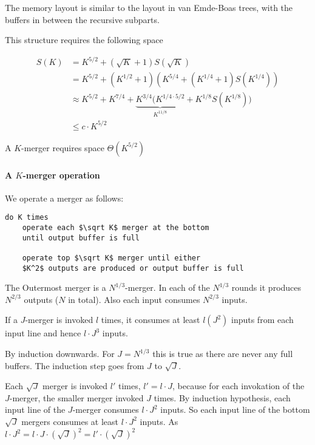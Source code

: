 The memory layout is similar to the layout in van Emde-Boas trees, with the buffers in between the recursive subparts. 

This structure requires the following space

\begin{align*}
S(K) &= K^{5/2} + (\sqrt K +1)S(\sqrt K)\\
	&= K^{5/2} + (K^{1/2}+1)(K^{5/4} + (K^{1/4}+1)S(K^{1/4}))\\
	&\approx K^{5/2} + K^{7/4} + \underbrace{K^{3/4}(K^{1/4\cdot 5/2}}_{K^{11/8}} + K^{1/8}S(K^{1/8}))\\
	&\leq c\cdot K^{5/2}
	\end{align*}
	
\begin{lem} A $K$-merger requires space $\Theta(K^{5/2})$\end{lem}

\paragraph{A $K$-merger operation} We operate a merger as follows:

\begin{lstlisting}
do K times
	operate each $\sqrt K$ merger at the bottom
	until output buffer is full
	
	operate top $\sqrt K$ merger until either
	$K^2$ outputs are produced or output buffer is full
\end{lstlisting}

The Outermost merger is a $N^{1/3}$-merger. In each of the $N^{1/3}$ rounds it produces $N^{2/3}$ outputs ($N$ in total). Also each input consumes $N^{2/3}$ inputs.

\begin{lem}
If a $J$-merger is invoked $l$ times, it consumes at least $l(J^2)$ inputs from each input line and hence $l\cdot J^3$ inputs.
\end{lem}

\begin{pr} By induction downwards. For $J=N^{1/3}$ this is true as there are never any full buffers. The induction step goes from $J$ to $\sqrt{J}$. 

Each $\sqrt{J}$ merger is invoked $l'$ times, $l'=l\cdot J$, because for each invokation of the $J$-merger, the smaller merger invoked $J$ times. By induction hypothesis, each input line of the $J$-merger consumes $l\cdot J^2$ inputs. So each input line of the bottom $\sqrt J$ mergers consumes at least $l\cdot J^2$ inputs. As $l\cdot J^2 = l\cdot J \cdot (\sqrt{J})^2 = l'\cdot (\sqrt{J})^2$ 
\end{pr}


